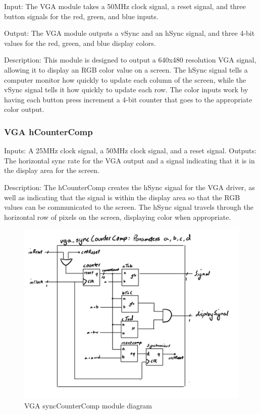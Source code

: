 \documentclass[a4paper]{article}
\begin{document}
Input: The VGA module takes a 50MHz clock signal, a reset signal, and three button signals for the red, green, and blue inputs.

Output: The VGA module outputs a vSync and an hSync signal, and three 4-bit values for the red, green, and blue display colors.

Description: This module is designed to output a 640x480 resolution VGA signal, allowing it to display an RGB color value on a screen. The hSync signal tells a computer monitor how quickly to update each column of the screen, while the vSync signal tells it how quickly to update each row. The color inputs work by having each button press increment a 4-bit counter that goes to the appropriate color output.

\subsubsection{VGA hCounterComp}


Inputs: A 25MHz clock signal, a 50MHz clock signal, and a reset signal.
Outputs: The horizontal sync rate for the VGA output and a signal indicating that it is in the display area for the screen.

Description: The hCounterComp creates the hSync signal for the VGA driver, as well as indicating that the signal is within the display area so that the RGB values can be communicated to the screen. The hSync signal travels through the horizontal row of pixels on the screen, displaying color when appropriate.

\begin{figure}[H]
    \includegraphics[width=0.8 \linewidth]{images/vgasyncCounterComp.JPG}
    \caption{VGA syncCounterComp module diagram}
    \label{vgaSyncCounterCompDiagram}
\end{figure}
\end{document}
